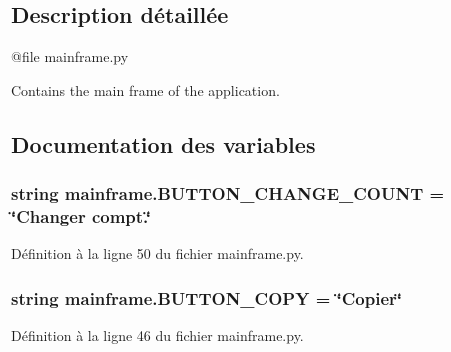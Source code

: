 \subsection{Description détaillée}
\begin{DoxyVerb}@file mainframe.py

Contains the main frame of the application.\end{DoxyVerb}
 

\subsection{Documentation des variables}
\hypertarget{namespacemainframe_aaedd3bab1a6fdbf293f4f84b258396ca}{}
\subsubsection[{B\+U\+T\+T\+O\+N\+\_\+\+C\+H\+A\+N\+G\+E\+\_\+\+C\+O\+U\+N\+T}]{\setlength{\rightskip}{0pt plus 5cm}string mainframe.\+B\+U\+T\+T\+O\+N\+\_\+\+C\+H\+A\+N\+G\+E\+\_\+\+C\+O\+U\+N\+T = \char`\"{}Changer compt.\char`\"{}}\label{namespacemainframe_aaedd3bab1a6fdbf293f4f84b258396ca}


Définition à la ligne 50 du fichier mainframe.\+py.

\hypertarget{namespacemainframe_a176b68c15c69fa4b7dc161350ee421e4}{}
\subsubsection[{B\+U\+T\+T\+O\+N\+\_\+\+C\+O\+P\+Y}]{\setlength{\rightskip}{0pt plus 5cm}string mainframe.\+B\+U\+T\+T\+O\+N\+\_\+\+C\+O\+P\+Y = \char`\"{}Copier\char`\"{}}\label{namespacemainframe_a176b68c15c69fa4b7dc161350ee421e4}


Définition à la ligne 46 du fichier mainframe.\+py.

\hypertarget{namespacemainframe_a5819a70500ef6ef239e7ab58a21b8558}{}

